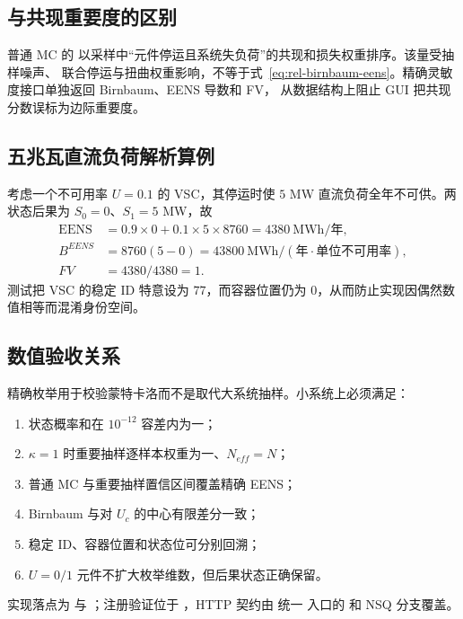 \subsection{与共现重要度的区别}
普通 MC 的  以采样中“元件停运且系统失负荷”的共现和损失权重排序。该量受抽样噪声、
联合停运与扭曲权重影响，不等于式~\eqref{eq:rel-birnbaum-eens}。精确灵敏度接口单独返回 Birnbaum、EENS 导数和 FV，
从数据结构上阻止 GUI 把共现分数误标为边际重要度。

\subsection{五兆瓦直流负荷解析算例}
考虑一个不可用率 $U=0.1$ 的 VSC，其停运时使 $5$ MW 直流负荷全年不可供。两状态后果为
$S_0=0$、$S_1=5$ MW，故
\begin{align}
 \mathrm{EENS}&=0.9\times0+0.1\times5\times8760=4380\ \mathrm{MWh}/\text{年},\\
 B^{EENS}&=8760(5-0)=43800\ \mathrm{MWh}/(\text{年}\cdot\text{单位不可用率}),\\
 FV&=4380/4380=1.
\end{align}
测试把 VSC 的稳定 ID 特意设为 $77$，而容器位置仍为 $0$，从而防止实现因偶然数值相等而混淆身份空间。

\subsection{数值验收关系}
精确枚举用于校验蒙特卡洛而不是取代大系统抽样。小系统上必须满足：
\begin{enumerate}
 \item 状态概率和在 $10^{-12}$ 容差内为一；
 \item $\kappa=1$ 时重要抽样逐样本权重为一、$N_{eff}=N$；
 \item 普通 MC 与重要抽样置信区间覆盖精确 EENS；
 \item Birnbaum 与对 $U_c$ 的中心有限差分一致；
 \item 稳定 ID、容器位置和状态位可分别回溯；
 \item $U=0/1$ 元件不扩大枚举维数，但后果状态正确保留。
\end{enumerate}
实现落点为  与
；注册验证位于 ，HTTP 契约由
统一  入口的  和 NSQ 分支覆盖。
